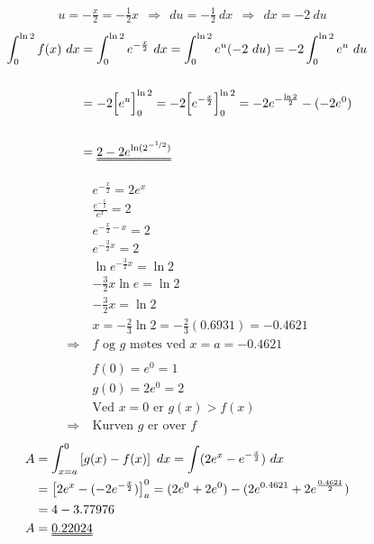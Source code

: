 \oppgaveDelSlutt


\newpage
{}
\oppgaveDelStart
{}
\begin{align*}
&u = - \frac{x}{2} = - \frac{1}{2} x \ \ \Rightarrow \ \ du = - \frac{1}{2} \ dx \ \ \Rightarrow \ \ dx = -2 \ du
\end{align*}
\begin{align*}
\int_0^{\ln 2} f(x) \ dx &= \int_0^{\ln 2} e^{- \frac{x}{2}} \ dx = \int_0^{\ln 2} e^u (-2 \ du) = -2 \int_0^{\ln 2} e^u \ du\\\\
&= -2 \Big[ e^u \Big]_0^{\ln 2} = -2 \Big[ e^{-\frac{x}{2}} \Big]_0^{\ln 2} = -2e^{-\frac{\ln2}{2}} - (-2e^0)\\\\
&= \uuline{2 - 2e^{\ln (2^{-\nicefrac{1}{2}})}}
\end{align*}

\begin{align*}
&e^{-\frac{x}{2}} = 2e^x\\
&\frac{e^{-\frac{x}{2}}}{e^x} = 2\\
&e^{-\frac{x}{2}-x} = 2\\
&e^{-\frac{3}{2}x} = 2\\
&\ln e^{-\frac{3}{2}x} = \ln 2\\
&-\frac{3}{2}x \ln e = \ln 2\\
&-\frac{3}{2}x = \ln 2\\
&x = - \frac{2}{3} \ln 2 = - \frac{2}{3}(0.6931) = -0.4621\\
\Rightarrow \ & \text{$f$ og $g$ møtes ved $x = a = -0.4621$}\\\\
&f(0) = e^0 = 1\\
&g(0) = 2e^0 = 2\\
&\text{Ved $x=0$ er $g(x) > f(x)$}\\
\Rightarrow \ &\text{Kurven $g$ er over $f$}
\end{align*}
\begin{align*}
A &= \int_{x=a}^0 \left[ g(x) - f(x) \right] \ dx = \int (2e^x - e^{-\frac{x}{2}}) \ dx\\
&= \left[ 2e^x - (-2 e ^{-\frac{x}{2}}) \right]_a^0 = (2e^0 + 2e^0) - (2e^{0.4621} + 2e^{\frac{0.4621}{2}})\\
&= 4 - 3.77976\\
A &= \uuline{0.22024}
\end{align*}
\oppgaveDelSlutt

